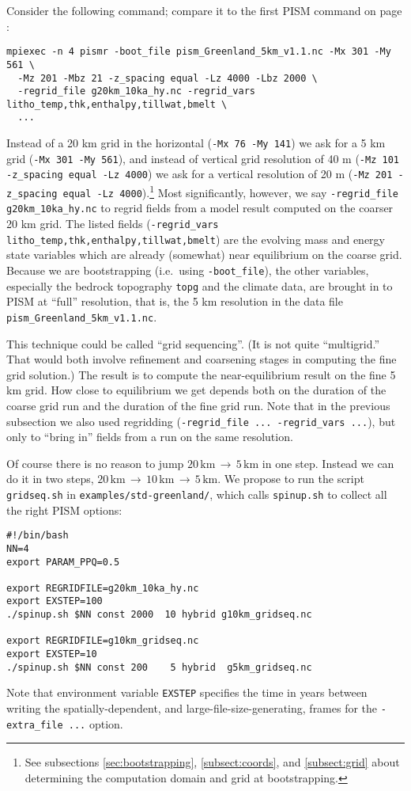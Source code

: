 Consider the following command; compare it to the first PISM command on page \pageref{firstcommand}:
\begin{verbatim}
mpiexec -n 4 pismr -boot_file pism_Greenland_5km_v1.1.nc -Mx 301 -My 561 \
  -Mz 201 -Mbz 21 -z_spacing equal -Lz 4000 -Lbz 2000 \
  -regrid_file g20km_10ka_hy.nc -regrid_vars litho_temp,thk,enthalpy,tillwat,bmelt \
  ...
\end{verbatim}
Instead of a 20 km grid in the horizontal (\verb|-Mx 76 -My 141|) we ask for a 5 km grid (\verb|-Mx 301 -My 561|), and instead of vertical grid resolution of 40 m (\verb|-Mz 101 -z_spacing equal -Lz 4000|) we ask for a vertical resolution of 20 m (\verb|-Mz 201 -z_spacing equal -Lz 4000|).\footnote{See subsections \ref{sec:bootstrapping}, \ref{subsect:coords}, and \ref{subsect:grid} about determining the computation domain and grid at bootstrapping.}  Most significantly, however, we say \verb|-regrid_file g20km_10ka_hy.nc| to regrid fields from a model result computed on the coarser 20 km grid.  The listed fields (\verb|-regrid_vars litho_temp,thk,enthalpy,tillwat,bmelt|) are the evolving mass and energy state variables which are already (somewhat) near equilibrium on the coarse grid.  Because we are bootstrapping (i.e.~using \verb|-boot_file|), the other variables, especially the bedrock topography \verb|topg| and the climate data, are brought in to PISM at ``full'' resolution, that is, the 5 km resolution in the data file \texttt{pism_Greenland_5km_v1.1.nc}.

This technique could be called ``grid sequencing''.  (It is not quite ``multigrid.''  That would both involve refinement and coarsening stages in computing the fine grid solution.)  The result is to compute the near-equilibrium result on the fine 5 km grid.  How close to equilibrium we get depends both on the duration of the coarse grid run and the duration of the fine grid run.  Note that in the previous subsection we also used regridding (\verb|-regrid_file ... -regrid_vars ...|), but only to ``bring in'' fields from a run on the same resolution.

Of course there is no reason to jump $20\,\text{km}\,\to\,5\,\text{km}$ in one step.  Instead we can do it in two steps, $20\,\text{km}\,\to\,10\,\text{km}\,\to\,5\,\text{km}$.  We propose to run the script \texttt{gridseq.sh} in \texttt{examples/std-greenland/}, which calls \texttt{spinup.sh} to collect all the right PISM options:
\small
\begin{verbatim}
#!/bin/bash
NN=4
export PARAM_PPQ=0.5

export REGRIDFILE=g20km_10ka_hy.nc
export EXSTEP=100
./spinup.sh $NN const 2000  10 hybrid g10km_gridseq.nc

export REGRIDFILE=g10km_gridseq.nc
export EXSTEP=10
./spinup.sh $NN const 200    5 hybrid  g5km_gridseq.nc
\end{verbatim}
\normalsize
Note that environment variable \verb|EXSTEP| specifies the time in years between writing the spatially-dependent, and large-file-size-generating, frames for the \verb|-extra_file ...| option.

